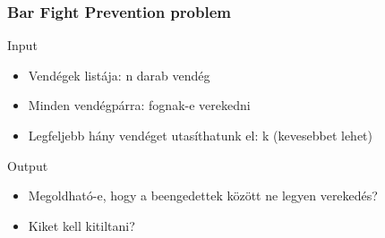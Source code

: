 \begin{frame}
\frametitle{Bar Fight Prevention problem}

Input
\begin{itemize}
\item Vendégek listája: n darab vendég
\item Minden vendégpárra: fognak-e verekedni
\item Legfeljebb hány vendéget utasíthatunk el: k (kevesebbet lehet)
\end{itemize}

Output
\begin{itemize}
\item Megoldható-e, hogy a beengedettek között ne legyen verekedés?
\item Kiket kell kitiltani?
\end{itemize}

\end{frame}

